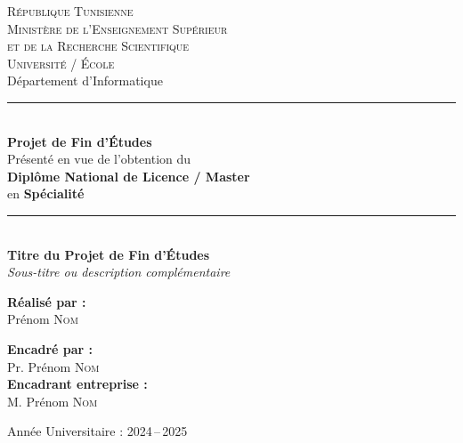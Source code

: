 
\begin{titlepage}
  \centering

  \vspace*{0.5cm}

  {\large\textsc{République Tunisienne}}\\[4pt]
  {\large\textsc{Ministère de l'Enseignement Supérieur}}\\[4pt]
  {\large\textsc{et de la Recherche Scientifique}}\\[20pt]


  {\Large\textsc{Université / École}}\\[6pt]
  {\large Département d'Informatique}\\[30pt]

  \rule{\textwidth}{1.2pt}\\[12pt]
  {\LARGE\bfseries\color{MidnightBlue} Projet de Fin d'Études}\\[6pt]
  {\large Présenté en vue de l'obtention du}\\[4pt]
  {\Large\bfseries Diplôme National de Licence / Master}\\[4pt]
  {\large en \textbf{Spécialité}}\\[12pt]
  \rule{\textwidth}{1.2pt}\\[30pt]

  {\Huge\bfseries\color{MidnightBlue}%
    Titre du Projet de Fin d'Études%
  }\\[8pt]
  {\large\itshape Sous-titre ou description complémentaire}\\[40pt]

  \begin{minipage}[t]{0.45\textwidth}
    \begin{flushleft}
      \textbf{Réalisé par :}\\[6pt]
      Prénom \textsc{Nom}
    \end{flushleft}
  \end{minipage}
  \hfill
  \begin{minipage}[t]{0.45\textwidth}
    \begin{flushright}
      \textbf{Encadré par :}\\[6pt]
      Pr. Prénom \textsc{Nom}\\[4pt]
      \textbf{Encadrant entreprise :}\\[6pt]
      M. Prénom \textsc{Nom}
    \end{flushright}
  \end{minipage}

  \vfill

  {\large Année Universitaire : 2024\,--\,2025}

\end{titlepage}
